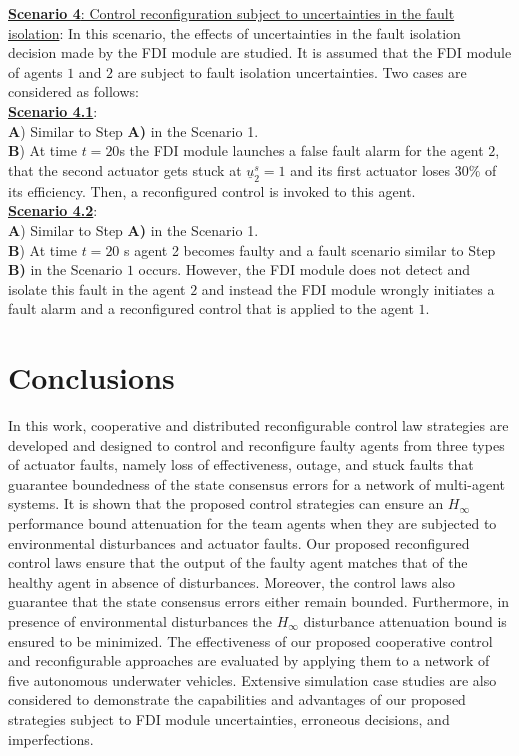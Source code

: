 \documentclass[12pt,draftcls,onecolumn]{IEEEtran}
\begin{document}
  \underline{  \textbf{Scenario 4}: Control reconfiguration subject to uncertainties in the fault isolation}: In this scenario, the effects of uncertainties in the fault isolation decision made by the FDI module are studied. It is assumed that the FDI module of agents $1$ and $2$ are subject to fault isolation uncertainties. Two cases are considered as follows: \\
 \underline{  \textbf{Scenario 4.1}}:\\
  \textbf{A}) Similar to Step \textbf{A)} in the Scenario 1.\\
  \textbf{B}) At  time $t=20$s the FDI module  launches a  false fault alarm for  the agent $2$, that the second actuator gets stuck at $\underline{u}_2^s=1$ and its first actuator loses $30\%$ of its efficiency.  
  Then, a reconfigured control is invoked to this agent.\\
  \underline{   \textbf{Scenario 4.2}}:\\
   \textbf{A}) Similar to Step \textbf{A)} in the Scenario 1.\\
  \textbf{B}) At  time $t=20$ s agent 2 becomes faulty and a fault scenario similar to Step \textbf{B)} in the Scenario $1$ occurs. However, the FDI module  does not detect and isolate this fault in the agent $2$ and instead the FDI module  wrongly initiates a fault alarm and a reconfigured control that is applied to the agent $1$. \par


\section{Conclusions }\label{conclusion}
In this work, cooperative and distributed reconfigurable control law strategies are developed and designed to control and reconfigure  faulty agents from three types of actuator faults, namely loss of effectiveness, outage, and stuck faults that guarantee boundedness  of the state consensus errors for a network of multi-agent systems.
  It is shown that the proposed control strategies can ensure an $H_{\infty}$ performance bound attenuation for the  team agents  when they are  subjected to environmental disturbances and actuator faults. 
 Our proposed reconfigured control laws ensure that the output of the faulty agent matches that of the healthy agent   in absence of disturbances.  Moreover, the control laws also guarantee that 
 the state consensus errors either remain bounded. Furthermore, in presence of environmental disturbances the $H_\infty$ disturbance attenuation bound is ensured to be minimized. The effectiveness of our proposed cooperative control and reconfigurable approaches are evaluated by applying them to a network of five autonomous underwater vehicles. Extensive simulation case studies are also considered to demonstrate  the capabilities and advantages of our proposed strategies subject to FDI module uncertainties, erroneous decisions, and imperfections.


\end{document}
